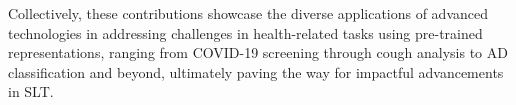 Collectively, these contributions showcase the diverse applications of advanced technologies in addressing challenges in health-related tasks using pre-trained representations, ranging from COVID-19 screening through cough analysis to AD classification and beyond, ultimately paving the way for impactful advancements in SLT. 
